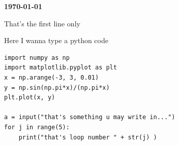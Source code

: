 \documentclass[17pt]{extarticle}
\begin{document}
\printindex

\begin{flushright}
{\bf \today}
\end{flushright}

\tableofcontents

\clearpage

That's the first line only


Here I wanna type a python code














































\lstset{frame=lines}
\lstset{basicstyle=\footnotesize}
\lstset{columns=fullflexible} %
\begin{lstlisting}
import numpy as np
import matplotlib.pyplot as plt
x = np.arange(-3, 3, 0.01)
y = np.sin(np.pi*x)/(np.pi*x)
plt.plot(x, y)

a = input("that's something u may write in...")
for j in range(5):
	print("that's loop number " + str(j) )
\end{lstlisting}
\end{document}
